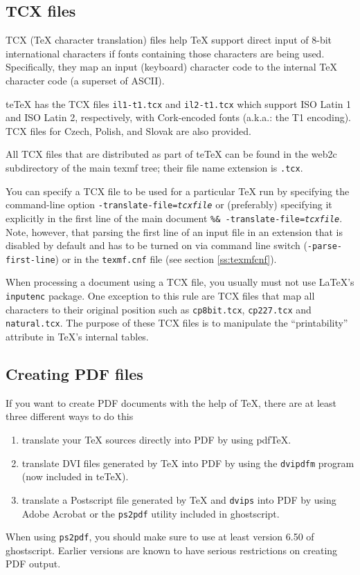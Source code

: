 \documentclass[11pt,a4paper]{article}
\newcommand{\teTeX}{\textrm{te}\TeX\xspace}
\begin{document}
\subsection{TCX files}
TCX (\TeX{} character translation) files help \TeX{} support direct
input of 8-bit international characters if fonts containing those
characters are being used.  Specifically, they map an input (keyboard)
character code to the internal \TeX{} character code (a superset of
ASCII).

\teTeX{} has the TCX files \verb+il1-t1.tcx+ and \verb+il2-t1.tcx+
which support ISO Latin 1 and ISO Latin 2, respectively, with
Cork-encoded fonts (a.k.a.: the T1 encoding).  TCX files for Czech,
Polish, and Slovak are also provided.

All TCX files that are distributed as part of \teTeX{} can be found in
the web2c subdirectory of the main texmf tree; their file name
extension is \verb+.tcx+.

You can specify a TCX file to be used for a particular \TeX{} run by
specifying the command-line option
\hbox{\texttt{-translate-file=\textsl{tcxfile}}} or (preferably)
specifying it explicitly in the first line of the main document
\hbox{\texttt{\%\& -translate-file=\textsl{tcxfile}}}. Note, however,
that parsing the first line of an input file in an extension that is
disabled by default and has to be turned on via command line switch
(\verb+-parse-first-line+) or in the \verb+texmf.cnf+ file (see
section \ref{ss:texmfcnf}).

When processing a document using a TCX file, you usually must not
use \LaTeX's \verb+inputenc+ package. One exception to this rule are
TCX files that map all characters to their original position such as
\verb+cp8bit.tcx+, \verb+cp227.tcx+ and \verb+natural.tcx+.  The purpose
of these TCX files is to manipulate the ``printability'' attribute in
\TeX's internal tables.

\subsection{Creating PDF files}
If you want to create PDF documents with the help of \TeX, there are
at least three different ways to do this
\begin{enumerate}
\item translate your \TeX{} sources directly into PDF by using pdf\TeX.
\item translate DVI files generated by \TeX{} into PDF by using the
  \texttt{dvipdfm} program (now included in \teTeX).
\item translate a Postscript file generated by \TeX{} and
  \texttt{dvips} into PDF by using Adobe Acrobat or
  the \texttt{ps2pdf} utility included in ghostscript. 
\end{enumerate}
When using \texttt{ps2pdf}, you should make sure to use at least
version 6.50 of ghostscript. Earlier versions are known to have
serious restrictions on creating PDF output.
\end{document}

